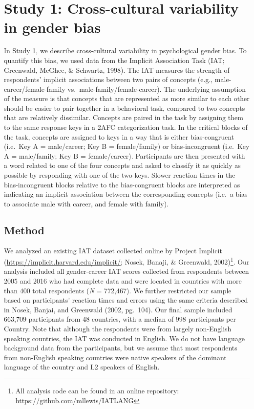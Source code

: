 \documentclass[10pt, letterpaper]{article}
\begin{document}
\section{Study 1: Cross-cultural variability in gender
bias}\label{study-1-cross-cultural-variability-in-gender-bias}

In Study 1, we describe cross-cultural variability in psychological
gender bias. To quantify this bias, we used data from the Implicit
Association Task (IAT; Greenwald, McGhee, \& Schwartz, 1998). The IAT
measures the strength of respondents' implicit associations between two
pairs of concepts (e.g., male-career/female-family
vs.~male-family/female-career). The underlying assumption of the measure
is that concepts that are represented as more similar to each other
should be easier to pair together in a behavioral task, compared to two
concepts that are relatively dissimilar. Concepts are paired in the task
by assigning them to the same response keys in a 2AFC categorization
task. In the critical blocks of the task, concepts are assigned to keys
in a way that is either bias-congruent (i.e.~Key A = male/career; Key B
= female/family) or bias-incongruent (i.e.~Key A = male/family; Key B =
female/career). Participants are then presented with a word related to
one of the four concepts and asked to classify it as quickly as possible
by responding with one of the two keys. Slower reaction times in the
bias-incongruent blocks relative to the bias-congruent blocks are
interpreted as indicating an implicit association between the
corresponding concepts (i.e.~a bias to associate male with career, and
female with family).

\subsection{Method}\label{method}

We analyzed an existing IAT dataset collected online by Project Implicit
(\url{https://implicit.harvard.edu/implicit/}; Nosek, Banaji, \&
Greenwald,
2002)\footnote{All analysis code can be found in an online repository: https://github.com/mllewis/IATLANG}.
Our analysis included all gender-career IAT scores collected from
respondents between 2005 and 2016 who had complete data and were located
in countries with more than 400 total respondents (\emph{N} = 772,467).
We further restricted our sample based on participants' reaction times
and errors using the same criteria described in Nosek, Banjai, and
Greenwald (2002, pg.~104). Our final sample included 663,709
participants from 48 countries, with a median of 998 participants per
Country. Note that although the respondents were from largely
non-English speaking countries, the IAT was conducted in English. We do
not have language background data from the participants, but we assume
that most respondents from non-English speaking countries were native
speakers of the dominant language of the country and L2 speakers of
English.
\end{document}
